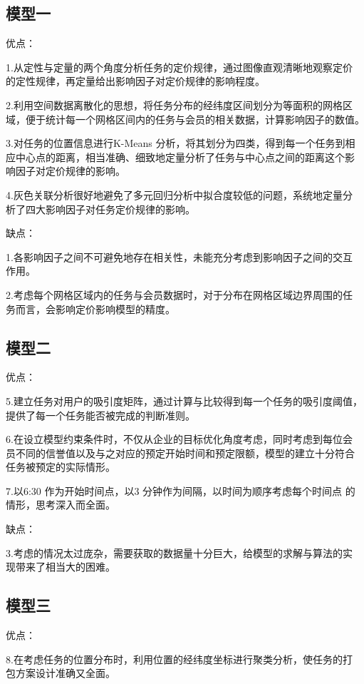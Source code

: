 \documentclass[withoutpreface,bwprint]{cumcmthesis} %
\begin{document}
\subsection{模型一}

优点：

1.从定性与定量的两个角度分析任务的定价规律，通过图像直观清晰地观察定价
的定性规律，再定量给出影响因子对定价规律的影响程度。

2.利用空间数据离散化的思想，将任务分布的经纬度区间划分为等面积的网格区
域，便于统计每一个网格区间内的任务与会员的相关数据，计算影响因子的数值。

3.对任务的位置信息进行K-Means 分析，将其划分为四类，得到每一个任务到相
应中心点的距离，相当准确、细致地定量分析了任务与中心点之间的距离这个影
响因子对定价规律的影响。

4.灰色关联分析很好地避免了多元回归分析中拟合度较低的问题，系统地定量分
析了四大影响因子对任务定价规律的影响。

缺点：

1.各影响因子之间不可避免地存在相关性，未能充分考虑到影响因子之间的交互
作用。

2.考虑每个网格区域内的任务与会员数据时，对于分布在网格区域边界周围的任
务而言，会影响定价影响模型的精度。

\subsection{模型二}

优点：

5.建立任务对用户的吸引度矩阵，通过计算与比较得到每一个任务的吸引度阈值，
提供了每一个任务能否被完成的判断准则。

6.在设立模型约束条件时，不仅从企业的目标优化角度考虑，同时考虑到每位会
员不同的信誉值以及与之对应的预定开始时间和预定限额，模型的建立十分符合
任务被预定的实际情形。

7.以6:30 作为开始时间点，以3 分钟作为间隔，以时间为顺序考虑每个时间点
的情形，思考深入而全面。

缺点：

3.考虑的情况太过庞杂，需要获取的数据量十分巨大，给模型的求解与算法的实
现带来了相当大的困难。

\subsection{模型三}

优点：

8.在考虑任务的位置分布时，利用位置的经纬度坐标进行聚类分析，使任务的打
包方案设计准确又全面。
\end{document}
